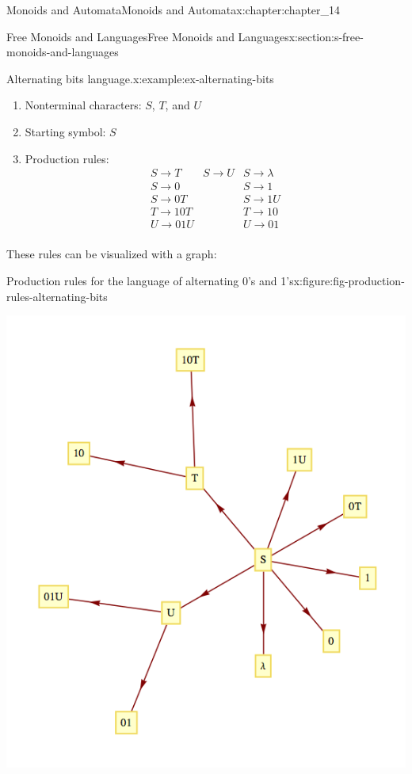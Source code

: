 \documentclass[oneside,10pt,]{book}
\numberwithin{equation}{section}
\begin{document}
\begin{chapterptx}{Monoids and Automata}{}{Monoids and Automata}{}{}{x:chapter:chapter_14}
\begin{sectionptx}{Free Monoids and Languages}{}{Free Monoids and Languages}{}{}{x:section:s-free-monoids-and-languages}
\begin{example}{Alternating bits language.}{x:example:ex-alternating-bits}
\begin{enumerate}[label=(\arabic*)]
\item{}Nonterminal characters: \(S\), \(T\), and \(U\)%
\item{}Starting symbol: \(S\)%
\item{}Production rules:%
\begin{equation*}
\begin{array}{ccc}
S\to T & S\to U & S\to \lambda\\
S\to 0& & S\to 1\\
S\to 0T&& S\to 1U \\
T\to 10T&& T\to 10\\
U\to 01U& & U\to 01\\
\end{array}
\end{equation*}
%
\end{enumerate}
%
\par
These rules can be visualized with a graph:%
\begin{figureptx}{Production rules for the language of alternating 0's and 1's}{x:figure:fig-production-rules-alternating-bits}{}%
\begin{image}{0.15}{0.7}{0.15}%
\includegraphics[width=\linewidth]{images/fig-production-rules-alternating-bits.png}

\end{image}
\end{figureptx}
\end{example}
\end{sectionptx}
\end{chapterptx}
\end{document}
